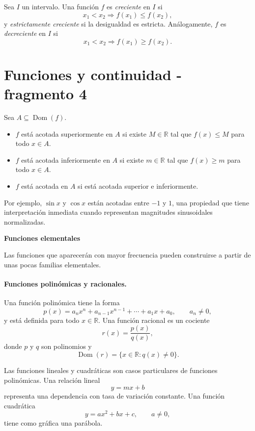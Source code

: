\begin{definition}[Monotonía]
Sea $I$ un intervalo. Una función $f$ es \emph{creciente} en $I$ si
\[
x_1<x_2\Longrightarrow f(x_1)\leq f(x_2),
\]
y \emph{estrictamente creciente} si la desigualdad es estricta. Análogamente, $f$ es \emph{decreciente} en $I$ si
\[
x_1<x_2\Longrightarrow f(x_1)\geq f(x_2).
\]
\end{definition}


\section{Funciones y continuidad - fragmento 4}
\begin{definition}[Acotación]
Sea $A\subseteq\operatorname{Dom}(f)$.
\begin{itemize}
\item $f$ está acotada superiormente en $A$ si existe $M\in\mathbb{R}$ tal que $f(x)\leq M$ para todo $x\in A$.
\item $f$ está acotada inferiormente en $A$ si existe $m\in\mathbb{R}$ tal que $f(x)\geq m$ para todo $x\in A$.
\item $f$ está acotada en $A$ si está acotada superior e inferiormente.
\end{itemize}
\end{definition}

Por ejemplo, $\sin x$ y $\cos x$ están acotadas entre $-1$ y $1$, una propiedad que tiene interpretación inmediata cuando representan magnitudes sinusoidales normalizadas.

\textbf{Funciones elementales}

Las funciones que aparecerán con mayor frecuencia pueden construirse a partir de unas pocas familias elementales.

\paragraph{Funciones polinómicas y racionales.}
Una función polinómica tiene la forma
\[
p(x)=a_nx^n+a_{n-1}x^{n-1}+\cdots+a_1x+a_0,
\qquad a_n\neq0,
\]
y está definida para todo $x\in\mathbb{R}$. Una función racional es un cociente
\[
r(x)=\frac{p(x)}{q(x)},
\]
donde $p$ y $q$ son polinomios y
\[
\operatorname{Dom}(r)=\{x\in\mathbb{R}:q(x)\neq0\}.
\]

Las funciones lineales y cuadráticas son casos particulares de funciones polinómicas. Una relación lineal
\[
y=mx+b
\]
representa una dependencia con tasa de variación constante. Una función cuadrática
\[
y=ax^2+bx+c,
\qquad a\neq0,
\]
tiene como gráfica una parábola.

